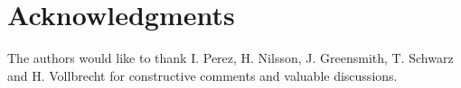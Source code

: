 \section*{Acknowledgments}
\begin{acks}

The authors would like to thank I. Perez, H. Nilsson, J. Greensmith, T. Schwarz and H. Vollbrecht for constructive comments and valuable discussions.
\end{acks}